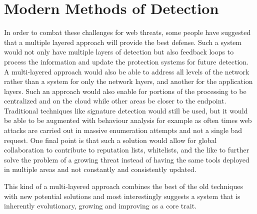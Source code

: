 \section{Modern Methods of Detection}

In order to combat these challenges for web threats, some people have suggested that a multiple layered approach will provide the best defense.  Such a system would not only have multiple layers of detection but also feedback loops to process the information and update the protection systems for future detection.  A multi-layered approach would also be able to address all levels of the network rather than a system for only the network layers, and another for the application layers.  Such an approach would also enable for portions of the processing to be centralized and on the cloud while other areas be closer to the endpoint.  Traditional techniques like signature detection would still be used, but it would be able to be augmented with behaviour analysis for example as often times web attacks are carried out in massive enumeration attempts and not a single bad request.  One final point is that such a solution would allow for global collaboration to contribute to reputation lists, whitelists, and the like to further solve the problem of a growing threat instead of having the same tools deployed in multiple areas and not constantly and consistently updated. %

This kind of a multi-layered approach combines the best of the old techniques with new potential solutions and most interestingly suggests a system that is inherently evolutionary, growing and improving as a core trait. 








